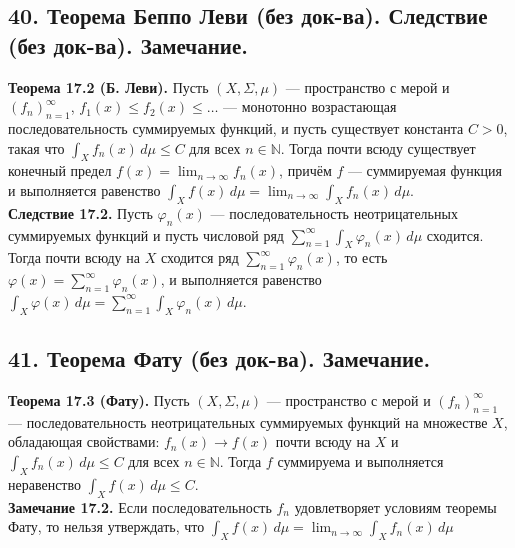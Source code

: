 \documentclass[12pt]{article}
\begin{document}
\subsection*{40. Теорема Беппо Леви (без док-ва). Следствие (без док-ва). Замечание.}
\textbf{Теорема 17.2 (Б. Леви).} Пусть $(X,\Sigma,\mu)$ — пространство с мерой и $(f_n)_{n=1}^\infty$, $f_1(x) \leq f_2(x) \leq \dots$ — монотонно возрастающая последовательность суммируемых функций, и пусть существует константа $C > 0$, такая что $\int_X f_n(x)\,d\mu \leq C$ для всех $n \in \mathbb{N}$. Тогда почти всюду существует конечный предел $f(x) = \lim_{n \to \infty} f_n(x)$, причём $f$ — суммируемая функция и выполняется равенство $\int_X f(x)\,d\mu = \lim_{n \to \infty} \int_X f_n(x)\,d\mu$. \\\textbf{Следствие 17.2.} Пусть $\varphi_n(x)$ — последовательность неотрицательных суммируемых функций и пусть числовой ряд $\sum_{n=1}^\infty \int_X \varphi_n(x)\,d\mu$ сходится. Тогда почти всюду на $X$ сходится ряд $\sum_{n=1}^\infty \varphi_n(x)$, то есть $\varphi(x) = \sum_{n=1}^\infty \varphi_n(x)$, и выполняется равенство $\int_X \varphi(x)\,d\mu = \sum_{n=1}^\infty \int_X \varphi_n(x)\,d\mu$.

\subsection*{41. Теорема Фату (без док-ва). Замечание.}
\textbf{Теорема 17.3 (Фату).} Пусть $(X,\Sigma,\mu)$ — пространство с мерой и $(f_n)_{n=1}^\infty$ — последовательность неотрицательных суммируемых функций на множестве $X$, обладающая свойствами: $f_n(x) \to f(x)$ почти всюду на $X$ и $\int_X f_n(x)\,d\mu \leq C$ для всех $n \in \mathbb{N}$. Тогда $f$ суммируема и выполняется неравенство $\int_X f(x)\,d\mu \leq C$. \\\textbf{Замечание 17.2.} Если последовательность $f_n$ удовлетворяет условиям теоремы Фату, то нельзя утверждать, что $\int_X f(x)\,d\mu = \lim_{n \to \infty} \int_X f_n(x)\,d\mu$

\end{document}
